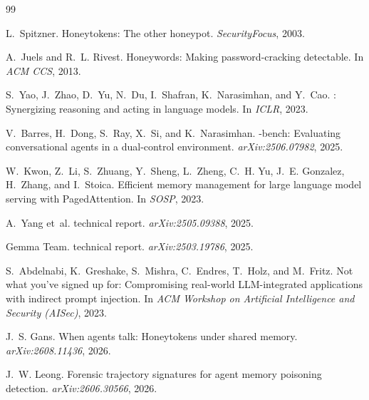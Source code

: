 \documentclass{article}
\begin{document}

\begin{thebibliography}{99}

L.~Spitzner.
\newblock Honeytokens: The other honeypot.
\newblock \emph{SecurityFocus}, 2003.

A.~Juels and R.~L. Rivest.
\newblock Honeywords: Making password-cracking detectable.
\newblock In \emph{ACM CCS}, 2013.

S.~Yao, J.~Zhao, D.~Yu, N.~Du, I.~Shafran, K.~Narasimhan, and Y.~Cao.
: Synergizing reasoning and acting in language models.
\newblock In \emph{ICLR}, 2023.

V.~Barres, H.~Dong, S.~Ray, X.~Si, and K.~Narasimhan.
-bench: Evaluating conversational agents in a
  dual-control environment.
\newblock \emph{arXiv:2506.07982}, 2025.

W.~Kwon, Z.~Li, S.~Zhuang, Y.~Sheng, L.~Zheng, C.~H. Yu, J.~E. Gonzalez,
H.~Zhang, and I.~Stoica.
\newblock Efficient memory management for large language model serving with
  {PagedAttention}.
\newblock In \emph{SOSP}, 2023.

A.~Yang et~al.
 technical report.
\newblock \emph{arXiv:2505.09388}, 2025.

{Gemma Team}.
 technical report.
\newblock \emph{arXiv:2503.19786}, 2025.

S.~Abdelnabi, K.~Greshake, S.~Mishra, C.~Endres, T.~Holz, and M.~Fritz.
\newblock Not what you've signed up for: Compromising real-world {LLM}-integrated applications with indirect prompt injection.
\newblock In \emph{ACM Workshop on Artificial Intelligence and Security
  (AISec)}, 2023.

J.~S. Gans.
\newblock When agents talk: Honeytokens under shared memory.
\newblock \emph{arXiv:2608.11436}, 2026.

J.~W. Leong.
\newblock Forensic trajectory signatures for agent memory poisoning detection.
\newblock \emph{arXiv:2606.30566}, 2026.

\end{thebibliography}

\appendix
\end{document}
